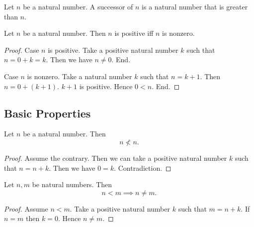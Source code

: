 \documentclass[10pt]{article}
\begin{document}
  \begin{forthel}
    \begin{definition}
      Let $n$ be a natural number.
      A successor of $n$ is a natural number that is greater than $n$.
    \end{definition}
  \end{forthel}

  \begin{forthel}
    \begin{proposition}
      Let $n$ be a natural number.
      Then $n$ is positive iff $n$ is nonzero.
    \end{proposition}
    \begin{proof}
      Case $n$ is positive.
        Take a positive natural number $k$ such that $n = 0 + k = k$.
        Then we have $n \neq 0$.
      End.

      Case $n$ is nonzero.
        Take a natural number $k$ such that $n = k + 1$.
        Then $n = 0 + (k + 1)$.
        $k + 1$ is positive.
        Hence $0 < n$.
      End.
    \end{proof}
  \end{forthel}


  \subsection*{Basic Properties}

  \begin{forthel}
    \begin{proposition}
      Let $n$ be a natural number.
      Then \[ n \nless n. \]
    \end{proposition}
    \begin{proof}
      Assume the contrary.
      Then we can take a positive natural number $k$ such that $n = n + k$.
      Then we have $0 = k$.
      Contradiction.
    \end{proof}
  \end{forthel}

  \begin{forthel}
    \begin{proposition}
      Let $n, m$ be natural numbers.
      Then \[ n < m \implies n \neq m. \]
    \end{proposition}
    \begin{proof}
      Assume $n < m$.
      Take a positive natural number $k$ such that $m = n + k$.
      If $n = m$ then $k = 0$.
      Hence $n \neq m$.
    \end{proof}
  \end{forthel}
\end{document}
